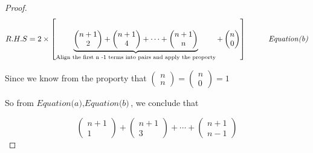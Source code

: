 \documentclass[12pt]{article}
\begin{document}
\begin{proof}
\[ R.H.S = 2 \times \left[ \underbrace{\begin{pmatrix}
        n+1  \\
        2
    \end{pmatrix}  + \begin{pmatrix}
              n+1 \\
              4
          
          \end{pmatrix} + \cdots + \begin{pmatrix}
                                       n+1 \\
                                       n 
    
          \end{pmatrix} }_\text{Align the first n -1 terms into pairs and apply the proporty}
          + \begin{pmatrix}
                              n \\
                              0
          \end{pmatrix} \right] \hspace*{1cm} \textit{Equation(b)} \]

    \newpage
    \hspace*{1.2cm}
    Since we know from the proporty that
    $\begin{pmatrix}
        n \\
        n
    \end{pmatrix} = \begin{pmatrix}
        n \\
        0
    \end{pmatrix} = 1 $

    \vspace*{0.3cm}
    \hspace*{1.2cm}
    So from $\textit{Equation(a)},\textit{Equation(b)}$, we conclude that

    \[ \begin{pmatrix}
        n+1  \\
        1
    \end{pmatrix}  + \begin{pmatrix}
              n+1 \\
              3
          
          \end{pmatrix} + \cdots + \begin{pmatrix}
                                       n+1 \\
                                       n-1 
    

\end{pmatrix}\]
\end{proof}
\end{document}
